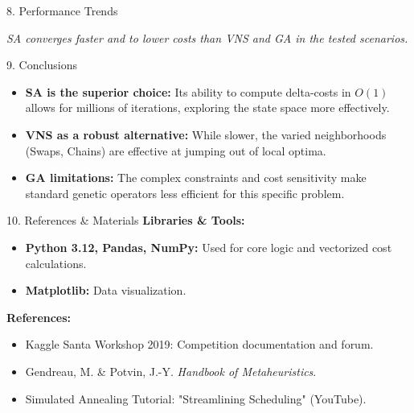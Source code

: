 \documentclass[aspectratio=169]{beamer}
\begin{document}
\begin{frame}{8. Performance Trends}
\begin{center}
\end{center}
\textit{SA converges faster and to lower costs than VNS and GA in the tested scenarios.}
\end{frame}

\begin{frame}{9. Conclusions}
\begin{itemize}
    \item \textbf{SA is the superior choice:} Its ability to compute delta-costs in $O(1)$ allows for millions of iterations, exploring the state space more effectively.
    \item \textbf{VNS as a robust alternative:} While slower, the varied neighborhoods (Swaps, Chains) are effective at jumping out of local optima.
    \item \textbf{GA limitations:} The complex constraints and cost sensitivity make standard genetic operators less efficient for this specific problem.
\end{itemize}
\end{frame}

\begin{frame}{10. References \& Materials}
\textbf{Libraries \& Tools:}
\begin{itemize}
    \item \textbf{Python 3.12, Pandas, NumPy:} Used for core logic and vectorized cost calculations.
    \item \textbf{Matplotlib:} Data visualization.
\end{itemize}

\textbf{References:}
\begin{itemize}
    \item Kaggle Santa Workshop 2019: Competition documentation and forum.
    \item Gendreau, M. \& Potvin, J.-Y. \textit{Handbook of Metaheuristics}.
    \item Simulated Annealing Tutorial: "Streamlining Scheduling" (YouTube).
\end{itemize}
\end{frame}
\end{document}
